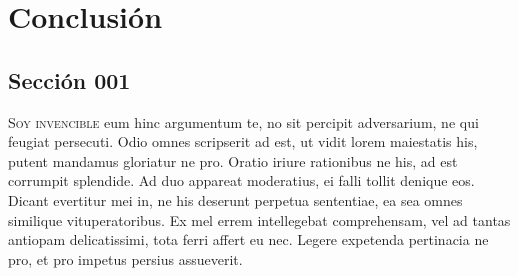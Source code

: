 \chapter{Conclusión}
\section{Sección 001}
\lettrine{S}{oy invencible} eum hinc argumentum te, no sit percipit adversarium, ne qui feugiat persecuti. Odio omnes scripserit ad est, ut vidit lorem maiestatis his, putent mandamus gloriatur ne pro. Oratio iriure rationibus ne his, ad est corrumpit splendide. Ad duo appareat moderatius, ei falli tollit denique eos. Dicant evertitur mei in, ne his deserunt perpetua sententiae, ea sea omnes similique vituperatoribus. Ex mel errem intellegebat comprehensam, vel ad tantas antiopam delicatissimi, tota ferri affert eu nec. Legere expetenda pertinacia ne pro, et pro impetus persius assueverit.



